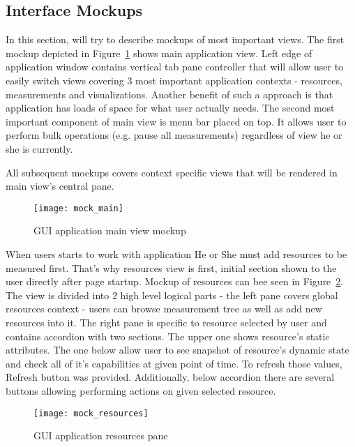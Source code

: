 \subsection{Interface Mockups}

In this section, will try to describe mockups of most important views. The first mockup depicted in
Figure~\ref{fig:mock_main} shows main application view. Left edge of application window contains vertical tab pane
controller that will allow user to easily switch views covering 3 most important application contexts - resources,
measurements and visualizations. Another benefit of such a approach is that application has loads of space for what
user actually needs. The second most important component of main view is menu bar placed on top. It allows user
to perform bulk operations (e.g. pause all measurements) regardless of view he or she is currently. 

All subsequent mockups covers context specific views that will be rendered in main view's central pane.



\begin{figure}[ht]
  \centering
  \texttt{[image: mock\_main]}
  \caption{GUI application main view mockup}
  \label{fig:mock_main}
\end{figure}

When users starts to work with application He or She must add resources to be measured first. That's why resources view
is first, initial section shown to the user directly after page startup. Mockup of resources can bee seen in
Figure~\ref{fig:mock_resources}. The view is divided into 2 high level logical parts - the left pane covers global
resources context - users can browse measurement tree as well as add new resources into it. The right pane is specific
to resource selected by user and contains accordion with two sections. The upper one shows resource's static
attributes. The one below allow user to see snapshot of resource's dynamic state and check all of it's capabilities at
given point of time. To refresh those values, Refresh button was provided. Additionally, below accordion there are
several buttons allowing performing actions on given selected resource.

\begin{figure}[ht]
  \centering
  \texttt{[image: mock\_resources]}
  \caption{GUI application resources pane}
  \label{fig:mock_resources}
\end{figure}


